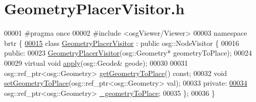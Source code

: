 \hypertarget{_geometry_placer_visitor_8h_source}{\section{Geometry\+Placer\+Visitor.\+h}
\label{_geometry_placer_visitor_8h_source}
}

\begin{DoxyCode}
00001 \textcolor{preprocessor}{#pragma once}
00002 \textcolor{preprocessor}{#include <osgViewer/Viewer>}
00003 \textcolor{keyword}{namespace }brtr \{
\hypertarget{_geometry_placer_visitor_8h_source_l00015}{}\hyperlink{classbrtr_1_1_geometry_placer_visitor}{00015}     \textcolor{keyword}{class }\hyperlink{classbrtr_1_1_geometry_placer_visitor}{GeometryPlacerVisitor} : \textcolor{keyword}{public} osg::NodeVisitor \{
00016     \textcolor{keyword}{public}:
00023         \hyperlink{classbrtr_1_1_geometry_placer_visitor_a5e6ca74eba57f86c0916434cb38eb7fc}{GeometryPlacerVisitor}(osg::Geometry* geometryToPlace);
00024 
00029         \textcolor{keyword}{virtual} \textcolor{keywordtype}{void} \hyperlink{classbrtr_1_1_geometry_placer_visitor_a26089587464d88953e38926162cb1c6e}{apply}(osg::Geode& geode);
00030 
00031         osg::ref\_ptr<osg::Geometry> \hyperlink{classbrtr_1_1_geometry_placer_visitor_ad784364cfe34434dc2183a5ead95db40}{getGeometryToPlace}() \textcolor{keyword}{const};
00032         \textcolor{keywordtype}{void} \hyperlink{classbrtr_1_1_geometry_placer_visitor_a95e8e5c2df5b9a31949c55c796c90fd5}{setGeometryToPlace}(osg::ref\_ptr<osg::Geometry> val);
00033     \textcolor{keyword}{private}:
\hypertarget{_geometry_placer_visitor_8h_source_l00034}{}\hyperlink{classbrtr_1_1_geometry_placer_visitor_a171826d64ddd04161d7525bc60faf045}{00034}         osg::ref\_ptr<osg::Geometry> \hyperlink{classbrtr_1_1_geometry_placer_visitor_a171826d64ddd04161d7525bc60faf045}{\_geometryToPlace};
00035     \};
00036 \}
\end{DoxyCode}
